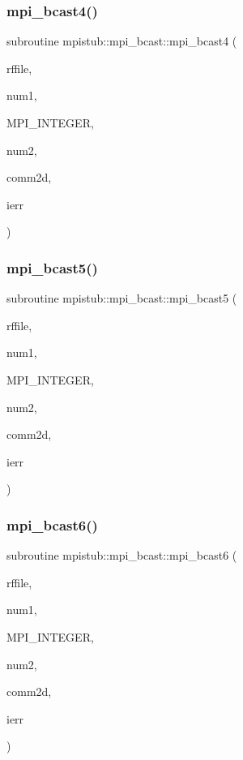 \subsubsection{\texorpdfstring{mpi\_bcast4()}{mpi\_bcast4()}}
{\footnotesize\ttfamily subroutine mpistub\+::mpi\+\_\+bcast\+::mpi\+\_\+bcast4 (\begin{DoxyParamCaption}\item[{integer}]{rffile,  }\item[{}]{num1,  }\item[{}]{M\+P\+I\+\_\+\+I\+N\+T\+E\+G\+ER,  }\item[{}]{num2,  }\item[{integer}]{comm2d,  }\item[{}]{ierr }\end{DoxyParamCaption})}

\mbox{\label{interfacempistub_1_1mpi__bcast_a9bf7b06275e20b4971abba4693dd1212}} 
\subsubsection{\texorpdfstring{mpi\_bcast5()}{mpi\_bcast5()}}
{\footnotesize\ttfamily subroutine mpistub\+::mpi\+\_\+bcast\+::mpi\+\_\+bcast5 (\begin{DoxyParamCaption}\item[{double precision, dimension(\+:,\+:)}]{rffile,  }\item[{}]{num1,  }\item[{}]{M\+P\+I\+\_\+\+I\+N\+T\+E\+G\+ER,  }\item[{}]{num2,  }\item[{integer}]{comm2d,  }\item[{}]{ierr }\end{DoxyParamCaption})}

\mbox{\label{interfacempistub_1_1mpi__bcast_a96892f1cb686f7bf3423a7446575097d}} 
\subsubsection{\texorpdfstring{mpi\_bcast6()}{mpi\_bcast6()}}
{\footnotesize\ttfamily subroutine mpistub\+::mpi\+\_\+bcast\+::mpi\+\_\+bcast6 (\begin{DoxyParamCaption}\item[{double precision, dimension(\+:,\+:,\+:)}]{rffile,  }\item[{}]{num1,  }\item[{}]{M\+P\+I\+\_\+\+I\+N\+T\+E\+G\+ER,  }\item[{}]{num2,  }\item[{integer}]{comm2d,  }\item[{}]{ierr }\end{DoxyParamCaption})}

